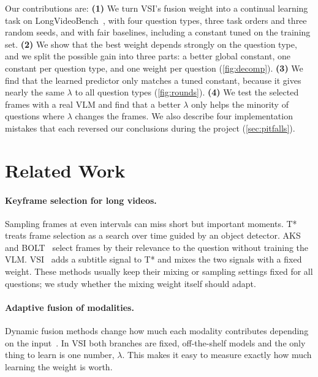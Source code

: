 \documentclass[10pt,twocolumn,letterpaper]{article}
\newcommand{\lam}{\lambda}
\begin{document}
Our contributions are:
\textbf{(1)} We turn VSI's fusion weight into a continual learning task on LongVideoBench~\cite{wu2024longvideobench}, with four question types, three task orders and three random seeds, and with fair baselines, including a constant tuned on the training set.
\textbf{(2)} We show that the best weight depends strongly on the question type, and we split the possible gain into three parts: a better global constant, one constant per question type, and one weight per question (\cref{fig:decomp}).
\textbf{(3)} We find that the learned predictor only matches a tuned constant, because it gives nearly the same $\lam$ to all question types (\cref{fig:rounds}).
\textbf{(4)} We test the selected frames with a real VLM and find that a better $\lam$ only helps the minority of questions where $\lam$ changes the frames.
We also describe four implementation mistakes that each reversed our conclusions during the project (\cref{sec:pitfalls}).

\section{Related Work}
\label{sec:related}

\paragraph{Keyframe selection for long videos.}
Sampling frames at even intervals can miss short but important moments.
T*~\cite{ye2025tstar} treats frame selection as a search over time guided by an object detector.
AKS~\cite{tang2025aks} and BOLT~\cite{liu2025bolt} select frames by their relevance to the question without training the VLM.
VSI~\cite{he2025vsi} adds a subtitle signal to T* and mixes the two signals with a fixed weight.
These methods usually keep their mixing or sampling settings fixed for all questions; we study whether the mixing weight itself should adapt.

\paragraph{Adaptive fusion of modalities.}
Dynamic fusion methods change how much each modality contributes depending on the input~\cite{xue2023dynamic}.
In VSI both branches are fixed, off-the-shelf models and the only thing to learn is one number, $\lam$.
This makes it easy to measure exactly how much learning the weight is worth.
\end{document}

